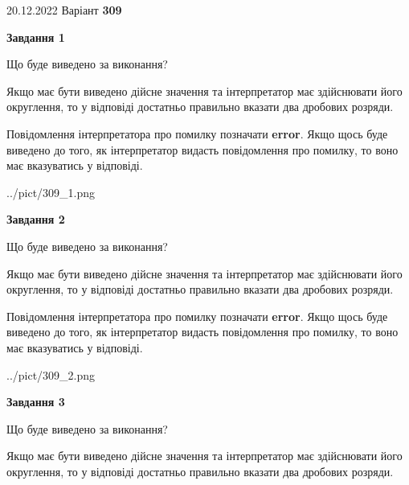\documentclass[12pt, ukrainian]{article}
\begin{document}
{20.12.2022 Варіант \No \textbf { 309 }\par}
{
\begin {Large}

{\begin {center}\textbf{Завдання 1}\end {center}}\par
Що буде виведено за виконання? \par

Якщо має бути виведено дійсне значення та інтерпретатор має здійснювати його округлення, 
то у відповіді достатньо правильно вказати два дробових розряди.

Повідомлення інтерпретатора про помилку позначати \textbf{error}.
Якщо щось буде виведено до того, як інтерпретатор видасть повідомлення про помилку, 
то воно має вказуватись у відповіді. \par

\begin{center}
	{../pict/309_1.png}
\end{center}
\newpage

{\begin {center}\textbf{Завдання 2}\end {center}}\par
Що буде виведено за виконання? \par

Якщо має бути виведено дійсне значення та інтерпретатор має здійснювати його округлення, 
то у відповіді достатньо правильно вказати два дробових розряди.

Повідомлення інтерпретатора про помилку позначати \textbf{error}.
Якщо щось буде виведено до того, як інтерпретатор видасть повідомлення про помилку, 
то воно має вказуватись у відповіді. \par

\begin{center}
	{../pict/309_2.png}
\end{center}
\newpage

{\begin {center}\textbf{Завдання 3}\end {center}}\par
Що буде виведено за виконання? \par

Якщо має бути виведено дійсне значення та інтерпретатор має здійснювати його округлення, 
то у відповіді достатньо правильно вказати два дробових розряди.


\end{Large}}
\end{document}
